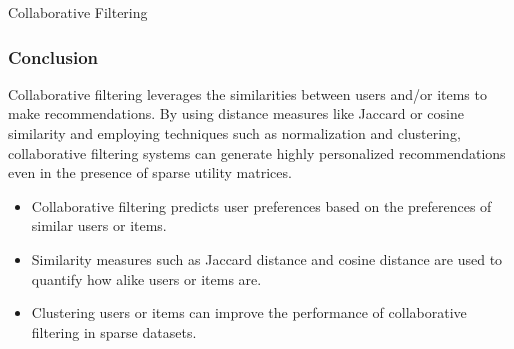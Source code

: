 \begin{notes}{Collaborative Filtering}
    \subsubsection*{Conclusion}
    
    Collaborative filtering leverages the similarities between users and/or items to make recommendations. By using distance measures like Jaccard or cosine similarity and employing techniques such as normalization 
    and clustering, collaborative filtering systems can generate highly personalized recommendations even in the presence of sparse utility matrices.
    
    \begin{highlight}
        \begin{itemize}
            \item Collaborative filtering predicts user preferences based on the preferences of similar users or items.
            \item Similarity measures such as Jaccard distance and cosine distance are used to quantify how alike users or items are.
            \item Clustering users or items can improve the performance of collaborative filtering in sparse datasets.
        \end{itemize}
    \end{highlight}
\end{notes}